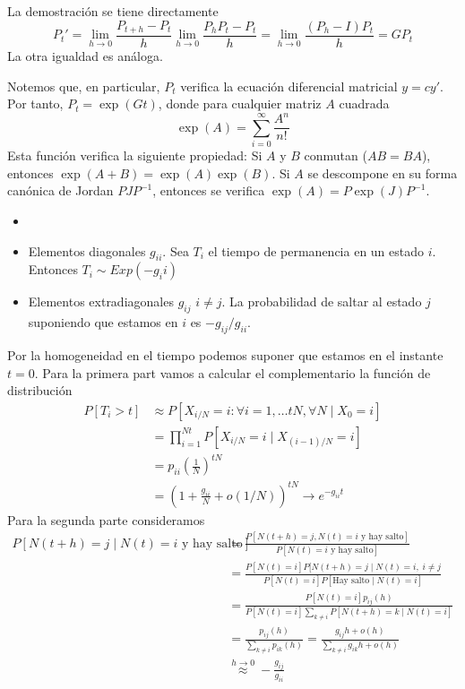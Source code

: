 \documentclass[PREyA.tex]{subfiles}
\begin{document}
\begin{dem}
La demostración se tiene directamente
$$
P_t' = \lim_{h\to0}\frac{P_{t+h}-P_t}{h} \lim_{h\to0}\frac{P_{h}P_t-P_t}{h} = \lim_{h\to0}\frac{(P_h-I)P_t}{h}=G P_t
$$
La otra igualdad es análoga.
\end{dem}
\begin{nota}
Notemos que, en particular, $P_t$ verifica la ecuación diferencial matricial $y=cy'$. Por tanto, $P_t = \exp(Gt)$, donde para cualquier matriz $A$ cuadrada
$$
\exp(A)=\sum_{i=0}^\infty \frac{A^n}{n!}
$$
Esta función verifica la siguiente propiedad: Si $A$ y $B$ conmutan ($AB=BA$), entonces $\exp(A+B)=\exp(A)\exp(B)$. Si $A$ se descompone en su forma canónica de Jordan $PJP^{-1}$, entonces se verifica $\exp(A)=P\exp(J)P^{-1}$.
\end{nota}
\begin{prop}[Interpretación de $G$] 
\begin{itemize}
\item[]
\item Elementos diagonales $g_{ii}$. Sea $T_i$ el tiempo de permanencia en un estado $i$. Entonces $T_i \sim Exp(-g_ii)$
\item Elementos extradiagonales $g_{ij}$ $i\neq j$.  La probabilidad de saltar al estado $j$ suponiendo que estamos en $i$ es $-g_{ij}/g_{ii}$.
\end{itemize}
\end{prop}
\begin{dem}
Por la homogeneidad en el tiempo podemos suponer que estamos en el instante $t=0$. Para la primera part vamos a calcular el complementario la función de distribución
\begin{align*}
P[T_i > t] &\approx P[X_{i/N} =i \colon \forall i = 1,\dotsc tN, \forall N \mid X_0 = i]\\
&= \prod_{i=1}^{Nt} P[X_{i/N}=i\mid X_{(i-1)/N}=i]\\
&= p_{ii}\left(\frac{1}{N}\right)^{tN} \\
&= \left(1+\frac{g_{ii}}{N}+o(1/N)\right)^{tN} \longrightarrow e^{-g_{ii} t}
\end{align*}
Para la segunda parte consideramos
\begin{align*}
P[N(t+h) = j \mid N(t)=i \text{ y hay salto}] &= \frac{P[N(t+h) = j, N(t)=i \text{ y hay salto}]}{P[N(t)=i \text{ y hay salto}]}\\
&=\frac{P[N(t)=i]P[N(t+h)=j\mid N(t)=i,\;i\neq j}{P[N(t)=i]P[\text{Hay salto}\mid N(t)=i]}\\
&=\frac{P[N(t)=i]p_{ij}(h)}{P[N(t)=i]\sum_{k\neq i} P[N(t+h)=k\mid N(t)=i]}\\
&=\frac{p_{ij}(h)}{\sum_{k\neq i} p_{ik}(h)}= \frac{g_{ij}h+o(h)}{\sum_{k\neq i} g_{ik}h+o(h)}\\
&\overset{h\to 0}{\approx} -\frac{g_{ij}}{g_{ii}}
\end{align*}
\end{dem} 
\end{document}
